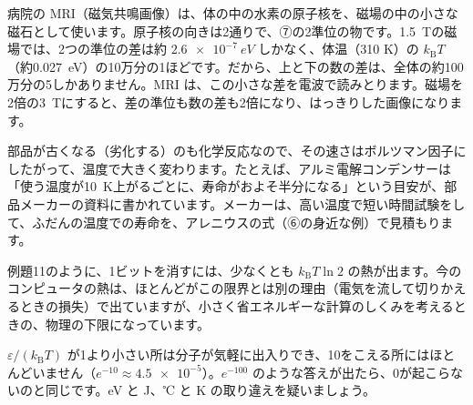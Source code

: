 \begin{phkougaku}
病院の MRI（磁気共鳴画像）は、体の中の水素の原子核を、磁場の中の小さな磁石として使います。原子核の向きは2通りで、⑦の2準位の物です。\qty{1.5}{T}の磁場では、2つの準位の差は約 $\qty{2.6e-7}{eV}$ しかなく、体温（310 K）の $k_{\mathrm B}T$（約\qty{0.027}{eV}）の10万分の1ほどです。だから、上と下の数の差は、全体の約100万分の5しかありません。MRI は、この小さな差を電波で読みとります。磁場を2倍の\qty{3}{T}にすると、差の準位も数の差も2倍になり、はっきりした画像になります。

部品が古くなる（劣化する）のも化学反応なので、その速さはボルツマン因子にしたがって、温度で大きく変わります。たとえば、アルミ電解コンデンサーは「使う温度が\qty{10}{K}上がるごとに、寿命がおよそ半分になる」という目安が、部品メーカーの資料に書かれています。メーカーは、高い温度で短い時間試験をして、ふだんの温度での寿命を、アレニウスの式（⑥の身近な例）で見積もります。

例題11のように、1ビットを消すには、少なくとも $k_{\mathrm B}T\ln2$ の熱が出ます。今のコンピュータの熱は、ほとんどがこの限界とは別の理由（電気を流して切りかえるときの損失）で出ていますが、小さく省エネルギーな計算のしくみを考えるときの、物理の下限になっています。

\begin{phketa}[熱の世界のエネルギーの大きさ]
$\varepsilon/(k_{\mathrm B}T)$ が1より小さい所は分子が気軽に出入りでき、10をこえる所にはほとんどいません（$e^{-10}\approx\num{4.5e-5}$）。$e^{-100}$ のような答えが出たら、0が起こらないのと同じです。eV と J、℃ と K の取り違えを疑いましょう。
\end{phketa}
\end{phkougaku}


